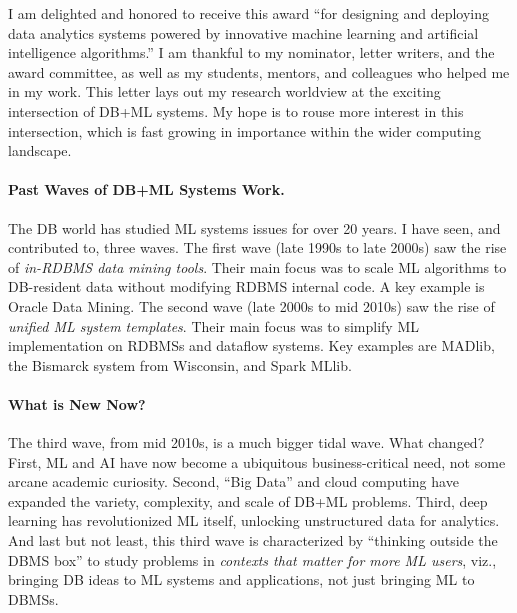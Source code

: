 \documentclass[11pt]{article}
\begin{document}


I am delighted and honored to receive this award ``for designing and deploying data analytics systems powered by innovative machine learning and artificial intelligence algorithms.'' 
I am thankful to my nominator, letter writers, and the award committee, as well as my students, mentors, and colleagues who helped me in my work. 
This letter lays out my research worldview at the exciting intersection of DB+ML systems. My hope is to rouse more interest in this intersection, 
which is fast growing in importance within the wider computing landscape.

\paragraph{Past Waves of DB+ML Systems Work.} The DB world has studied ML systems issues for over 20 years. I have seen, and 
contributed to, three waves. The first wave (late 1990s to late 2000s) saw the rise of \textit{in-RDBMS data mining tools}. Their main 
focus was to scale ML algorithms to DB-resident data without modifying RDBMS internal code. A key example is Oracle Data Mining.
The second wave (late 2000s to mid 2010s) saw the rise of \textit{unified ML system templates}. Their main focus was to simplify ML 
implementation on RDBMSs and dataflow systems. Key examples are MADlib, the Bismarck system from Wisconsin, and Spark MLlib.

\paragraph{What is New Now?} The third wave, from mid 2010s, is a much bigger tidal wave. What changed? 
First, ML and AI have now become a ubiquitous business-critical need, not some arcane academic curiosity.
Second, ``Big Data'' and cloud computing have expanded the variety, complexity, and scale of DB+ML problems. 
Third, deep learning has revolutionized ML itself, unlocking unstructured data for analytics. And last but not least, 
this third wave is characterized by ``thinking outside the DBMS box'' to study problems in \textit{contexts that matter 
for more ML users}, viz., bringing DB ideas to ML systems and applications, not just bringing ML to DBMSs.
\end{document}
